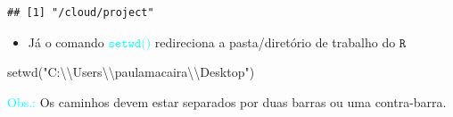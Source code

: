 \documentclass[
]{book}
\newenvironment{Shaded}{\begin{snugshade}}{\end{snugshade}}
\newcommand{\FunctionTok}[1]{\textcolor[rgb]{0.00,0.00,0.00}{#1}}
\newcommand{\NormalTok}[1]{#1}
\newcommand{\SpecialCharTok}[1]{\textcolor[rgb]{0.00,0.00,0.00}{#1}}
\newcommand{\StringTok}[1]{\textcolor[rgb]{0.31,0.60,0.02}{#1}}
\providecommand{\tightlist}{%
  \setlength{\itemsep}{0pt}\setlength{\parskip}{0pt}}
\begin{document}
\begin{verbatim}
## [1] "/cloud/project"
\end{verbatim}

\begin{itemize}
\tightlist
\item
  Já o comando \textcolor{cyan}{$\texttt{setwd()}$} redireciona a pasta/diretório de trabalho do \(\texttt{R}\)
\end{itemize}

\begin{Shaded}
\begin{Highlighting}[]
\FunctionTok{setwd}\NormalTok{(}\StringTok{"C:}\SpecialCharTok{\textbackslash{}\textbackslash{}}\StringTok{Users}\SpecialCharTok{\textbackslash{}\textbackslash{}}\StringTok{paulamacaira}\SpecialCharTok{\textbackslash{}\textbackslash{}}\StringTok{Desktop"}\NormalTok{)}
\end{Highlighting}
\end{Shaded}

\textcolor{cyan}{Obs.:} Os caminhos devem estar separados por duas barras ou uma contra-barra.

  
\end{document}
